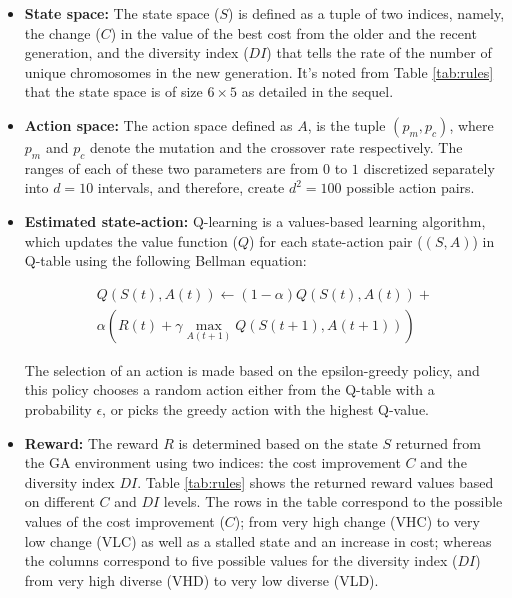 \documentclass[acmsmall]{acmart}
\begin{document}
\begin{itemize}
\item \textbf{State space:} The state space ($S$) is defined as a tuple of two indices, namely, the change ($C$) in the value of the best cost from the older and the recent generation, and the diversity index ($DI$) that tells the rate of the number of unique chromosomes in the new generation. It's noted from Table \ref{tab:rules} that the state space is of size $6 \times 5$ as detailed in the sequel.

\item \textbf{Action space:} The action space defined as $A$, is the tuple $(p_{m}, p_{c})$, where $p_m$ and $p_{c}$ denote the mutation and the crossover rate respectively. The ranges of each of these two parameters are from $0$ to $1$ discretized separately into $d=10$ intervals, and therefore, create $d^2=100$ possible action pairs.

\item \textbf{Estimated state-action:} Q-learning is a values-based learning algorithm, which updates the value function ($Q$) for each state-action pair ($(S,A)$) in Q-table using the following Bellman equation:

\begin{equation}\label{eq:Qfun}
\begin{aligned}
    Q(S(t), A(t)) \leftarrow (1-\alpha)Q(S(t), A(t)) + \\
    \alpha(R(t)+\gamma \max\limits_{A(t+1)} Q(S(t+1), A(t+1)))
\end{aligned}    
\end{equation}

The selection of an action is made based on the epsilon-greedy policy, and this policy chooses a random action either from the Q-table with a probability $\epsilon$, or picks the greedy action with the highest Q-value. 
\item \textbf{Reward:} The reward $R$ is determined based on the state $S$ returned from the GA environment using two indices: the cost improvement $C$ and the diversity index $DI$. Table \ref{tab:rules} shows the returned reward values based on different $C$ and $DI$ levels. The rows in the table correspond to the possible values of the cost improvement ($C$); from very high change (VHC) to very low change (VLC) as well as a stalled state and an increase in cost; whereas the columns correspond to five possible values for the diversity index ($DI$) from very high diverse (VHD) to very low diverse (VLD).
\end{itemize}
\end{document}
